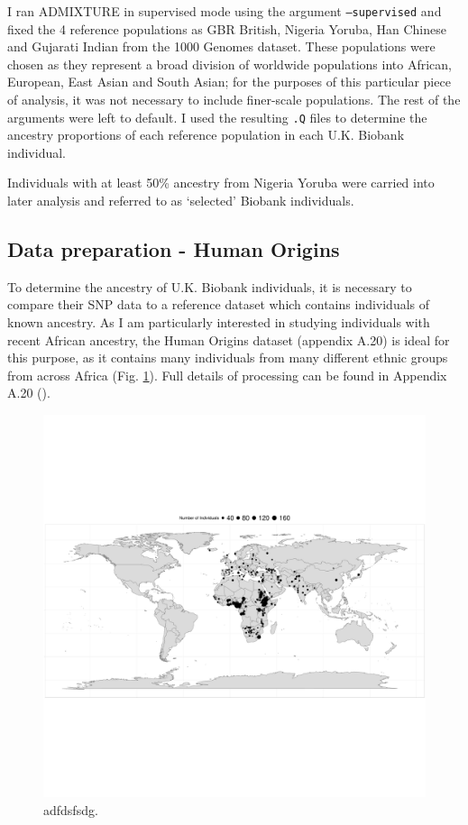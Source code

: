 I ran ADMIXTURE in supervised mode using the argument \texttt{--supervised} and fixed the 4 reference populations as GBR British, Nigeria Yoruba, Han Chinese and Gujarati Indian from the 1000 Genomes dataset. These populations were chosen as they represent a broad division of worldwide populations into African, European, East Asian and South Asian; for the purposes of this particular piece of analysis, it was not necessary to include finer-scale populations. The rest of the arguments were left to default. I used the resulting \texttt{.Q} files to determine the ancestry proportions of each reference population in each U.K. Biobank individual. 

Individuals with at least 50\% ancestry from Nigeria Yoruba were carried into later analysis and referred to as `selected' Biobank individuals.

\subsection{Data preparation - Human Origins}

To determine the ancestry of U.K. Biobank individuals, it is necessary to compare their SNP data to a reference dataset which contains individuals of known ancestry. As I am particularly interested in studying individuals with recent African ancestry, the Human Origins dataset (appendix A.20) is ideal for this purpose, as it contains many individuals from many different ethnic groups from across Africa (Fig. \ref{fig:HumanOriginsMap}). Full details of processing can be found in Appendix A.20 ().

\begin{figure}
    \centering
    \includegraphics[width=1.0\textwidth]{../images/chapter3/HumanOriginsMap.pdf}
    \caption{adfdsfsdg.}
    \label{fig:HumanOriginsMap}
\end{figure}

